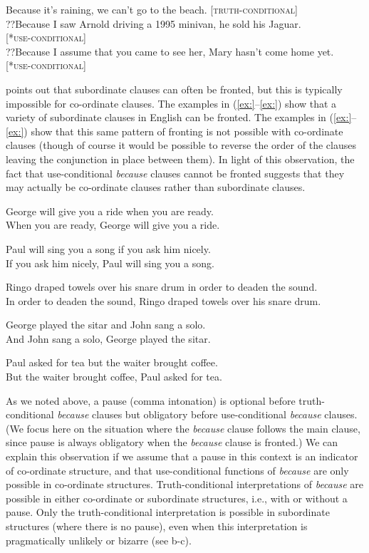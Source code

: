 \ea
\ea  Because it’s raining, we can’t go to the beach.  [\textsc{truth-conditional}]\\
\ex ??Because I saw Arnold driving a 1995 minivan, he sold his Jaguar. \\
  {}[*\textsc{use-conditional}]\\
\ex ??Because I assume that you came to see her, Mary hasn’t come home yet.\\
  {}[*\textsc{use-conditional}]
                       \z
\z


\citet{Haspelmath1995} points out that subordinate clauses can often be fronted, but this is typically impossible for co-ordinate clauses. The examples in (\ref{ex:}--\ref{ex:}) show that a variety of subordinate clauses in English can be fronted. The examples in (\ref{ex:}--\ref{ex:}) show that this same pattern of fronting is not possible with co-ordinate clauses (though of course it would be possible to reverse the order of the clauses leaving the conjunction in place between them). In light of this observation, the fact that use-conditional \textit{because} clauses cannot be fronted suggests that they may actually be co-ordinate clauses rather than subordinate clauses.


\ea
\ea George will give you a ride when you are ready.\\
\ex When you are ready, George will give you a ride.
                       \z
\z

\ea
\ea Paul will sing you a song if you ask him nicely.\\
\ex If you ask him nicely, Paul will sing you a song.
\z \z

\ea
\ea Ringo draped towels over his snare drum in order to deaden the sound.\\
\ex In order to deaden the sound, Ringo draped towels over his snare drum.
                       \z
\z

\ea
\ea George played the sitar and John sang a solo.\\
\ex *And John sang a solo, George played the sitar.
                       \z
\z

\ea
\ea Paul asked for tea but the waiter brought coffee.\\
\ex *But the waiter brought coffee, Paul asked for tea.
                       \z
\z


As we noted above, a pause (comma intonation) is optional before truth-conditional \textit{because} clauses but obligatory before use-conditional \textit{because} clauses. (We focus here on the situation where the \textit{because} clause follows the main clause, since pause is always obligatory when the \textit{because} clause is fronted.) We can explain this observation if we assume that a pause in this context is an indicator of co-ordinate structure, and that use-conditional functions of \textit{because} are only possible in co-ordinate structures. Truth-conditional interpretations of \textit{because} are possible in either co-ordinate or subordinate structures, i.e., with or without a pause. Only the truth-conditional interpretation is possible in subordinate structures (where there is no pause), even when this interpretation is pragmatically unlikely or bizarre (see b-c).



